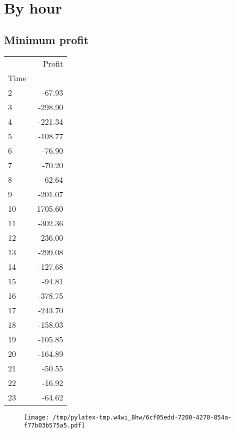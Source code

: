 \documentclass{article}%
\begin{document}
%
\newpage %
\section{By hour}%
\label{sec:Byhour}%
\subsection{Minimum profit }%
\label{subsec:Minimumprofit}%
\begin{tabular}{lr}
\toprule
{} &   Profit \\
Time &          \\
\midrule
2    &   -67.93 \\
3    &  -298.90 \\
4    &  -221.34 \\
5    &  -108.77 \\
6    &   -76.90 \\
7    &   -70.20 \\
8    &   -62.64 \\
9    &  -201.07 \\
10   & -1705.60 \\
11   &  -302.36 \\
12   &  -236.00 \\
13   &  -299.08 \\
14   &  -127.68 \\
15   &   -94.81 \\
16   &  -378.75 \\
17   &  -243.70 \\
18   &  -158.03 \\
19   &  -105.85 \\
20   &  -164.89 \\
21   &   -50.55 \\
22   &   -16.92 \\
23   &   -64.62 \\
\bottomrule
\end{tabular}
%


\begin{figure}[htbp]%
\centering%
\texttt{[image: /tmp/pylatex-tmp.w4wi\_8hw/6cf05edd-7200-4270-854a-f77b03b575a5.pdf]}%
\end{figure}

%
\newpage %
\end{document}
